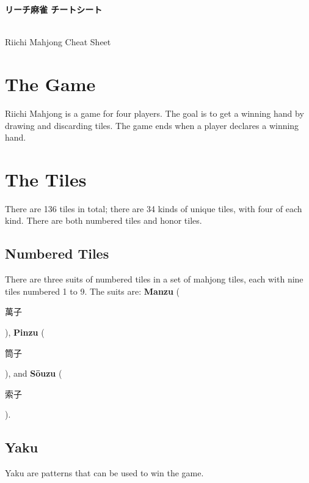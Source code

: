 \documentclass[12pt,landscape]{article}
\begin{document}
\begin{minipage}[t][.8\textheight][t]{\textwidth}
\begin{multicols*}{3}

    \begin{center}
        \begin{CJK}{UTF8}{min}
            \Large\textbf{リーチ麻雀 チートシート}
        \end{CJK}\\
        \small{Riichi Mahjong Cheat Sheet}
    \end{center}

    \section{The Game}
    Riichi Mahjong is a game for four players. 
    The goal is to get a winning hand by drawing and discarding tiles.
    The game ends when a player declares a winning hand.

    \section{The Tiles}
    There are 136 tiles in total; there are 34 kinds of unique tiles, with four of each kind.
    There are both numbered tiles and honor tiles.
    
    \subsection{Numbered Tiles}
    There are three suits of numbered tiles in a set of mahjong tiles, each with nine tiles numbered 1 to 9.
    The suits are: \textbf{Manzu} (\begin{CJK}{UTF8}{min}萬子\end{CJK}), 
    \textbf{Pinzu} (\begin{CJK}{UTF8}{min}筒子\end{CJK}), 
    and \textbf{Sōuzu} (\begin{CJK}{UTF8}{min}索子\end{CJK}).\\

    \subsection{Yaku}
    Yaku are patterns that can be used to win the game.

\end{multicols*}
\end{minipage}
\end{document}
